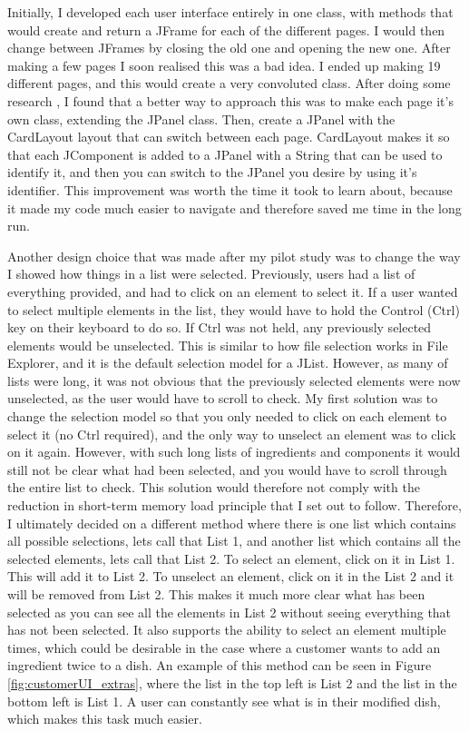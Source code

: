 Initially, I developed each user interface entirely in one class, with methods that would create and return a JFrame for each of the different pages. I would then change between JFrames by closing the old one and opening the new one. After making a few pages I soon realised this was a bad idea. I ended up making 19 different pages, and this would create a very convoluted class. After doing some research \cite{card_layout_2011}, I found that a better way to approach this was to make each page it's own class, extending the JPanel class. Then, create a JPanel with the CardLayout layout that can switch between each page. CardLayout makes it so that each JComponent is added to a JPanel with a String that can be used to identify it, and then you can switch to the JPanel you desire by using it's identifier. This improvement was worth the time it took to learn about, because it made my code much easier to navigate and therefore saved me time in the long run.

Another design choice that was made after my pilot study was to change the way I showed how things in a list were selected. Previously, users had a list of everything provided, and had to click on an element to select it. If a user wanted to select multiple elements in the list, they would have to hold the Control (Ctrl) key on their keyboard to do so. If Ctrl was not held, any previously selected elements would be unselected. This is similar to how file selection works in File Explorer, and it is the default selection model for a JList. However, as many of lists were long, it was not obvious that the previously selected elements were now unselected, as the user would have to scroll to check. My first solution was to change the selection model so that you only needed to click on each element to select it (no Ctrl required), and the only way to unselect an element was to click on it again. However, with such long lists of ingredients and components it would still not be clear what had been selected, and you would have to scroll through the entire list to check. This solution would therefore not comply with the reduction in short-term memory load principle that I set out to follow. Therefore, I ultimately decided on a different method where there is one list which contains all possible selections, lets call that List 1, and another list which contains all the selected elements, lets call that List 2. To select an element, click on it in List 1. This will add it to List 2. To unselect an element, click on it in the List 2 and it will be removed from List 2. This makes it much more clear what has been selected as you can see all the elements in List 2 without seeing everything that has not been selected. It also supports the ability to select an element multiple times, which could be desirable in the case where a customer wants to add an ingredient twice to a dish. An example of this method can be seen in Figure \ref{fig:customerUI_extras}, where the list in the top left is List 2 and the list in the bottom left is List 1. A user can constantly see what is in their modified dish, which makes this task much easier.

